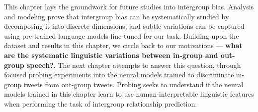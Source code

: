 This chapter lays the groundwork for future studies into intergroup bias. Analysis and modeling prove that intergroup bias can be systematically studied by decomposing it into discrete dimensions, and subtle variations can be captured using pre-trained language models fine-tuned for our task. Building upon the dataset and results in this chapter, we circle back to our motivations --- \textbf{what are the systematic linguistic variations between in-group and out-group speech?}. The next chapter attempts to answer this question, through focused probing experiments into the neural models trained to discriminate in-group tweets from out-group tweets. Probing seeks to understand if the neural models trained in this chapter learn to use human-interpretable linguistic features when performing the task of intergroup relationship prediction.

